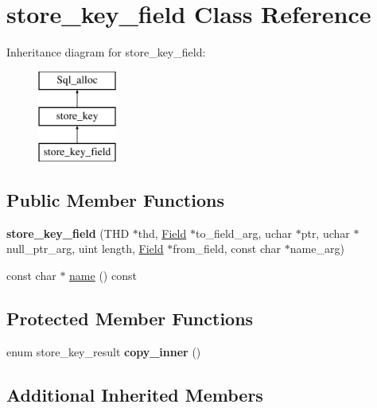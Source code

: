 \hypertarget{classstore__key__field}{}\section{store\+\_\+key\+\_\+field Class Reference}
\label{classstore__key__field}
Inheritance diagram for store\+\_\+key\+\_\+field\+:\begin{figure}[H]
\begin{center}
\leavevmode
\includegraphics[height=3.000000cm]{classstore__key__field}
\end{center}
\end{figure}
\subsection*{Public Member Functions}
\begin{DoxyCompactItemize}
\item 
\mbox{\label{classstore__key__field_aee16bb48187eccb2a220efe292abc2ca}} 
{\bfseries store\+\_\+key\+\_\+field} (T\+HD $\ast$thd, \mbox{\hyperlink{classField}{Field}} $\ast$to\+\_\+field\+\_\+arg, uchar $\ast$ptr, uchar $\ast$null\+\_\+ptr\+\_\+arg, uint length, \mbox{\hyperlink{classField}{Field}} $\ast$from\+\_\+field, const char $\ast$name\+\_\+arg)
\item 
const char $\ast$ \mbox{\hyperlink{classstore__key__field_acc151e2c25c0fe5c09d2a28c4595413b}{name}} () const
\end{DoxyCompactItemize}
\subsection*{Protected Member Functions}
\begin{DoxyCompactItemize}
\item 
\mbox{\label{classstore__key__field_abf36e6242e832457f964921b4e412d8e}} 
enum store\+\_\+key\+\_\+result {\bfseries copy\+\_\+inner} ()
\end{DoxyCompactItemize}
\subsection*{Additional Inherited Members}


